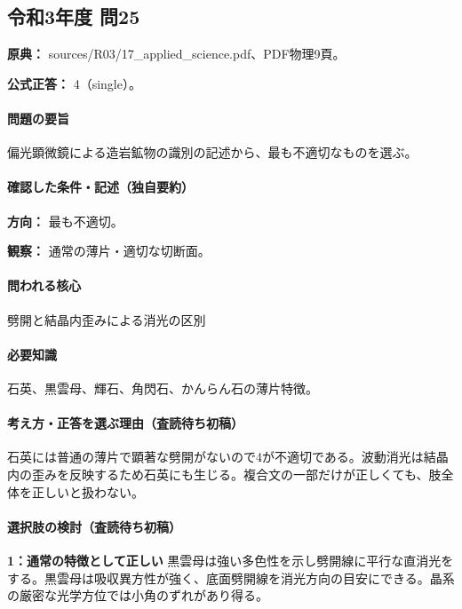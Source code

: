 \subsection{令和3年度 問25}
\label{q:r03-reg-applied-25}

\noindent\textbf{原典：} sources/R03/17\_applied\_science.pdf、PDF物理9頁。

\textbf{公式正答：} 4（single）。

\paragraph{問題の要旨} 偏光顕微鏡による造岩鉱物の識別の記述から、最も不適切なものを選ぶ。

\paragraph{確認した条件・記述（独自要約）}\mbox{}\par

\noindent\textbf{方向：} 最も不適切。\par

\noindent\textbf{観察：} 通常の薄片・適切な切断面。\par

\paragraph{問われる核心} 劈開と結晶内歪みによる消光の区別

\paragraph{必要知識} 石英、黒雲母、輝石、角閃石、かんらん石の薄片特徴。

\paragraph{考え方・正答を選ぶ理由（査読待ち初稿）} 石英には普通の薄片で顕著な劈開がないので4が不適切である。波動消光は結晶内の歪みを反映するため石英にも生じる。複合文の一部だけが正しくても、肢全体を正しいと扱わない。

\paragraph{選択肢の検討（査読待ち初稿）}\mbox{}\par

\noindent\textbf{1：通常の特徴として正しい} 黒雲母は強い多色性を示し劈開線に平行な直消光をする。黒雲母は吸収異方性が強く、底面劈開線を消光方向の目安にできる。晶系の厳密な光学方位では小角のずれがあり得る。\par


